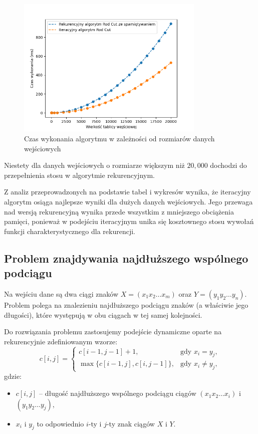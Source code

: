 \documentclass{article}
\begin{document}
\begin{figure}[H]
    \centering
    \includegraphics[width=0.8\textwidth]{Figure_4.png}
    \caption{Czas wykonania algorytmu w zależności od rozmiarów danych wejściowych}
    \label{fig:mi_cut_rodt}
\end{figure}
Niestety dla danych wejściowych o rozmiarze większym niż $20,000$ dochodzi do przepełnienia stosu w algorytmie rekurencyjnym.

Z analiz przeprowadzonych na podstawie tabel i wykresów wynika, że iteracyjny algorytm osiąga najlepsze wyniki dla dużych danych wejściowych. Jego przewaga nad wersją rekurencyjną wynika przede wszystkim z mniejszego obciążenia pamięci, ponieważ w podejściu iteracyjnym unika się kosztownego stosu wywołań funkcji charakterystycznego dla rekurencji.
\subsection{Problem znajdywania najdłuższego wspólnego podciągu}
Na wejściu dane są dwa ciągi znaków $ X = (x_1 x_2 \dots x_m) $ oraz $ Y = (y_1 y_2 \dots y_n) $. Problem polega na znalezieniu najdłuższego podciągu znaków (a właściwie jego długości), które występują w obu ciągach w tej samej kolejności.

Do rozwiązania problemu zastosujemy podejście dynamiczne oparte na rekurencyjnie zdefiniowanym wzorze:
\begin{equation}
   c[i, j] = 
   \begin{cases} 
      c[i-1, j-1] + 1, & \text{gdy } x_i = y_j, \\ 
      \max \{ c[i-1, j], c[i, j-1] \}, & \text{gdy } x_i \neq y_j,
   \end{cases}
\nonumber
\end{equation}
gdzie:
\begin{itemize}
    \item $ c[i,j] $ – długość najdłuższego wspólnego podciągu ciągów $ (x_1 x_2 \dots x_i) $ i $ (y_1 y_2 \dots y_j) $,
    \item $ x_i $ i $ y_j $ to odpowiednio $ i $-ty i $ j $-ty znak ciągów $ X $ i $ Y $.
\end{itemize}
\end{document}
